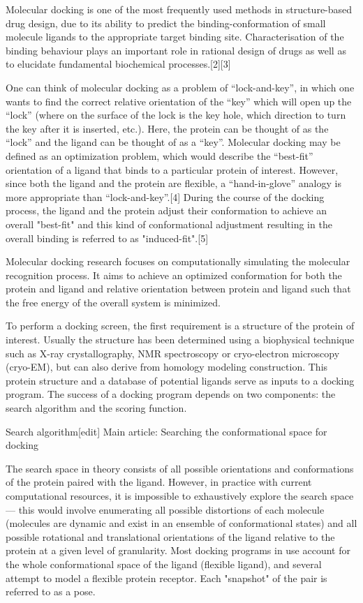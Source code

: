 Molecular docking is one of the most frequently used methods in structure-based drug design, due to its ability to predict the binding-conformation of small molecule ligands to the appropriate target binding site. Characterisation of the binding behaviour plays an important role in rational design of drugs as well as to elucidate fundamental biochemical processes.[2][3]

One can think of molecular docking as a problem of “lock-and-key”, in which one wants to find the correct relative orientation of the “key” which will open up the “lock” (where on the surface of the lock is the key hole, which direction to turn the key after it is inserted, etc.). Here, the protein can be thought of as the “lock” and the ligand can be thought of as a “key”. Molecular docking may be defined as an optimization problem, which would describe the “best-fit” orientation of a ligand that binds to a particular protein of interest. However, since both the ligand and the protein are flexible, a “hand-in-glove” analogy is more appropriate than “lock-and-key”.[4] During the course of the docking process, the ligand and the protein adjust their conformation to achieve an overall "best-fit" and this kind of conformational adjustment resulting in the overall binding is referred to as "induced-fit".[5]

Molecular docking research focuses on computationally simulating the molecular recognition process. It aims to achieve an optimized conformation for both the protein and ligand and relative orientation between protein and ligand such that the free energy of the overall system is minimized.

To perform a docking screen, the first requirement is a structure of the protein of interest. Usually the structure has been determined using a biophysical technique such as X-ray crystallography, NMR spectroscopy or cryo-electron microscopy (cryo-EM), but can also derive from homology modeling construction. This protein structure and a database of potential ligands serve as inputs to a docking program. The success of a docking program depends on two components: the search algorithm and the scoring function.

Search algorithm[edit]
Main article: Searching the conformational space for docking

The search space in theory consists of all possible orientations and conformations of the protein paired with the ligand. However, in practice with current computational resources, it is impossible to exhaustively explore the search space — this would involve enumerating all possible distortions of each molecule (molecules are dynamic and exist in an ensemble of conformational states) and all possible rotational and translational orientations of the ligand relative to the protein at a given level of granularity. Most docking programs in use account for the whole conformational space of the ligand (flexible ligand), and several attempt to model a flexible protein receptor. Each "snapshot" of the pair is referred to as a pose.

